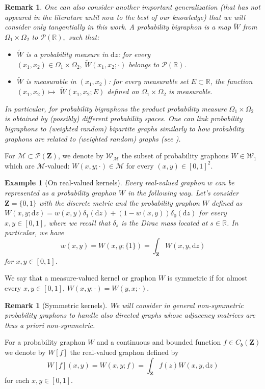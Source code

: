 \documentclass[11pt]{article}
\newtheorem{example}[theorem]{Example}
\newtheorem{remark}[theorem]{Remark}
\def\R{\mathbb{R}}
\newcommand{\cM}{{\mathcal M}}  %
\newcommand{\cP}{{\mathcal P}}  %
\newcommand{\cW}{{\mathcal W}}  %
\newcommand{\Space}{\mathbf{Z}}
\newcommand{\CbFunct}{C_b(\Space)}
\newcommand{\Graphon}{\mathcal{W}_1}
\newcommand{\drv}{\mathrm{d}}
\begin{document}
\begin{remark}\label{RmkProbBigraphons}
One can also consider another important generalization (that has not appeared in the literature until now to the best of our knowledge) that we will consider only tangentially in this work. A \emph{probability bigraphon}  is a map $\widetilde W$ from $\Omega_1\times \Omega_2$ to $\mathcal{P}(\R),$ such that:
\begin{itemize}
    \item $\widetilde W$ is a probability measure in $\mathrm{d} z$: for every $(x_1, x_2) \in \Omega_1\times \Omega_2, \ \widetilde W(x_1, x_2 ; \cdot)$ belongs to $\mathcal{P}(\R)$.
    \item $\widetilde W$ is measurable in $(x_1, x_2)$: for every measurable set $E \subset \R$, the function $(x_1, x_2) \mapsto$ $\widetilde W(x_1, x_2 ; E)$ defined on $\Omega_1\times \Omega_2$ is measurable.
    
    \end{itemize}
In particular, for probability bigraphons the product probability measure $\Omega_1 \times \Omega_2$
is obtained by (possibly) different probability spaces.    
One can link probability bigraphons to (weighted random) bipartite graphs similarly to how probability graphons are related to (weighted random) graphs (see \cite{abraham2023probabilitygraphons}).  
\end{remark}

For  $\cM\subset \cP(\Space)$, we  denote  by $\cW  _\cM$  the subset  of probability graphons  $W\in  \Graphon$  which are  $\cM$-valued: $W(x,y; \cdot)\in \cM$ for every $(x,y)\in [0, 1]^2$.

\begin{example}[On real-valued kernels]\label{rem:real-valued-kernels}
Every real-valued  graphon  $w$ can be represented as a probability graphon $W$ in the following way. Let's consider $\Space =\{ 0, 1\}$ with the discrete metric and the probability graphon $W$ defined as $W(x,y;\drv z)  = w(x,y)  \delta_1(\drv z) +  (1-w(x,y)) \delta_0(\drv z)$ for every $x,y\in[0,1]$, where we recall that $\delta_s$ is the Dirac mass located at $s\in \R$. In particular, we have $$w(x,y)=W(x,y; \{1\})=\int_{\Space}W(x,y,\drv z)$$ for $x,y \in [0, 1]$. 
\end{example}

We say that a measure-valued kernel or graphon $W$ is symmetric 
if for almost every $x,y \in [0,1]$, $W(x,y;\cdot)=W(y,x;\cdot)$.

\begin{remark}[Symmetric kernels]
We will consider in general non-symmetric probability graphons to handle also directed graphs whose
adjacency matrices are thus \emph{a priori} non-symmetric.
\end{remark}
For a probability graphon $W$ and a continuous and bounded function $f\in \CbFunct$ we denote by $W[f]$ the real-valued graphon defined by 
$$
W[f](x,y)=W(x,y;f)=\int_{\Space}f(z)W(x,y,\mathrm{d}z)
$$
for each $x,y\in [0,1].$
\end{document}
